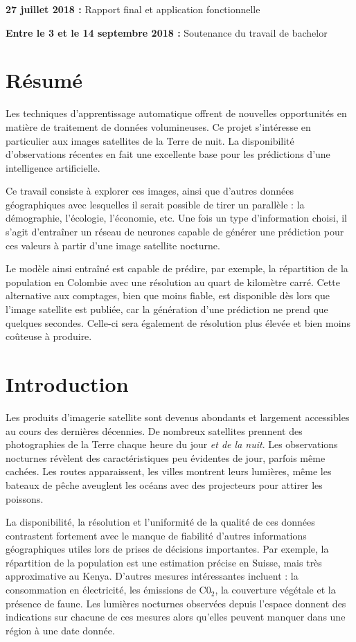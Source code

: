 \documentclass[a4paper, 11pt]{report}
\begin{document}
\textbf{27 juillet 2018 :} Rapport final et application fonctionnelle

\textbf{Entre le 3 et le 14 septembre 2018 :} Soutenance du travail de bachelor

\chapter{Résumé}

Les techniques d'apprentissage automatique offrent de nouvelles opportunités en matière de traitement de données volumineuses. Ce projet s'intéresse en particulier aux images satellites de la Terre de nuit. La disponibilité d'observations récentes en fait une excellente base pour les prédictions d'une intelligence artificielle.

Ce travail consiste à explorer ces images, ainsi que d'autres données géographiques avec lesquelles il serait possible de tirer un parallèle : la démographie, l'écologie, l'économie, etc. Une fois un type d'information choisi, il s'agit d'entraîner un réseau de neurones capable de générer une prédiction pour ces valeurs à partir d'une image satellite nocturne.

Le modèle ainsi entraîné est capable de prédire, par exemple, la répartition de la population en Colombie avec une résolution au quart de kilomètre carré. Cette alternative aux comptages, bien que moins fiable, est disponible dès lors que l'image satellite est publiée, car la génération d'une prédiction ne prend que quelques secondes. Celle-ci sera également de résolution plus élevée et bien moins coûteuse à produire.

\chapter{Introduction}
Les produits d'imagerie satellite sont devenus abondants et largement accessibles au cours des dernières décennies. De nombreux satellites prennent des photographies de la Terre chaque heure du jour \textit{et de la nuit}. Les observations nocturnes révèlent des caractéristiques peu évidentes de jour, parfois même cachées. Les routes apparaissent, les villes montrent leurs lumières, même les bateaux de pêche aveuglent les océans avec des projecteurs pour attirer les poissons.

La disponibilité, la résolution et l'uniformité de la qualité de ces données contrastent fortement avec le manque de fiabilité d'autres informations géographiques utiles lors de prises de décisions importantes. Par exemple, la répartition de la population est une estimation précise en Suisse, mais très approximative au Kenya. D'autres mesures intéressantes incluent : la consommation en électricité, les émissions de C0$_2$, la couverture végétale et la présence de faune. Les lumières nocturnes observées depuis l'espace donnent des indications sur chacune de ces mesures alors qu'elles peuvent manquer dans une région à une date donnée.
\end{document}
